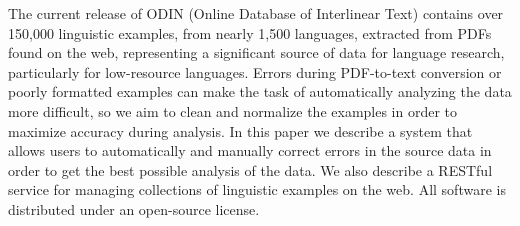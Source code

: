The current release of ODIN (Online Database of Interlinear Text) contains over 150,000 linguistic examples, from nearly 1,500 languages, extracted from PDFs found on the web, representing a significant source of data for language research, particularly for low-resource languages. Errors during PDF-to-text conversion or poorly formatted examples can make the task of automatically analyzing the data more difficult, so we aim to clean and normalize the examples in order to maximize accuracy during analysis. In this paper we describe a system that allows users to automatically and manually correct errors in the source data in order to get the best possible analysis of the data. We also describe a RESTful service for managing collections of linguistic examples on the web. All software is distributed under an open-source license.
